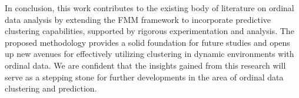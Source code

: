 \documentclass{article}
\begin{document}
In conclusion, this work contributes to the existing body of literature on ordinal data analysis by extending the FMM framework to incorporate predictive clustering capabilities, supported by rigorous experimentation and analysis. The proposed methodology provides a solid foundation for future studies and opens up new avenues for effectively utilizing clustering in dynamic environments with ordinal data. We are confident that the insights gained from this research will serve as a stepping stone for further developments in the area of ordinal data clustering and prediction.


\printbibliography
\end{document}
